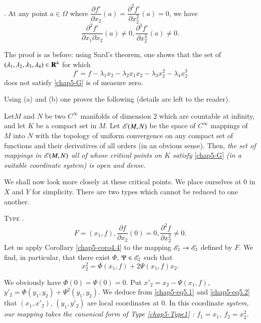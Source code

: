 \noindent
{}.\label{chap5-G} At any point $a\in \Omega$ where $\dfrac{\partial f'}{\partial x_{2}}(a)=\dfrac{\partial^{2}f'}{\partial x^{2}_{2}}(a)=0$, we have
$$
\dfrac{\partial^{2}f'}{\partial x_{1}\partial x_{2}}(a)\neq 0, \dfrac{\partial^{3}f'}{\partial x^{3}_{2}}(a)\neq 0.
$$

The proof is as before: using Sard's theorem, one shows that the set of $(\lambda_{1},\lambda_{2},\lambda_{3},\lambda_{4})\in \mathbf{R}^{4}$ for which
$$
f'=f-\lambda_{1}x_{2}-\lambda_{2}x_{1}x_{2}-\lambda_{3}x^{2}_{2}-\lambda_{4}x^{3}_{2}
$$
does not satisfy \eqref{chap5-G} is of measure zero.

Using (a) and (b) one proves the following (details are left to the reader).

Let\pageoriginale $M$ and $N$ be two $C^{\infty}$ manifolds of dimension 2 which are countable at infinity, and let $K$ be a compact set in $M$. Let $\mathscr{E}(M,N)$ be the space of $C^{\infty}$ mappings of $M$ into $N$ with the topology of uniform convergence on any compact set of functions and their derivatives of all orders (in an obvious sense). Then, {\em the set of mappings in $\mathscr{E}(M,N)$ all of whose critical points on $K$ satisfy} \eqref{chap5-G} {\em (in a suitable coordinate system) is open and dense.}

We shall now look more closely at these critical points. We place ourselves at $0$ in $X$ and $Y$ for simplicity. There are two types which cannot be reduced to one another.

\smallskip
\textsc{Type \label{chap5-Type1}}.
\begin{equation}
F=(x_{1},f),\dfrac{\partial f}{\partial x_{2}}(0)=0,\dfrac{\partial^{2}f}{\partial x^{2}_{2}}\neq 0.\label{chap5-eq5.1}
\end{equation}
Let us apply Corollary \ref{chap5-coro4.4} to the mapping $\mathscr{E}_{2}\to \mathscr{E}_{2}$ defined by $F$. We find, in particular, that there exist $\Phi$, $\Psi\in \mathscr{E}_{2}$ such that
\begin{equation}
x^{2}_{2}=\Phi(x_{1},f)+2\Psi(x_{1},f)x_{2}.\label{chap5-eq5.2}
\end{equation}

We obviously have $\Phi(0)=\Psi(0)=0$. Put $x'_{2}=x_{2}-\Psi(x_{1},f)$, $y'_{2}=\Phi(y_{1},y_{2})+\Psi^{2}(y_{1},y_{2})$. We deduce from \eqref{chap5-eq5.1} and \eqref{chap5-eq5.2} that $(x_{1},x'_{2})$, $(y_{1},y'_{2})$ are local coordinates at $0$. In this coordinate {\em system, our mapping takes the canonical form of Type \ref{chap5-Type1} : $f_{1}=x_{1}$, $f_{2}=x^{2}_{2}$.}

